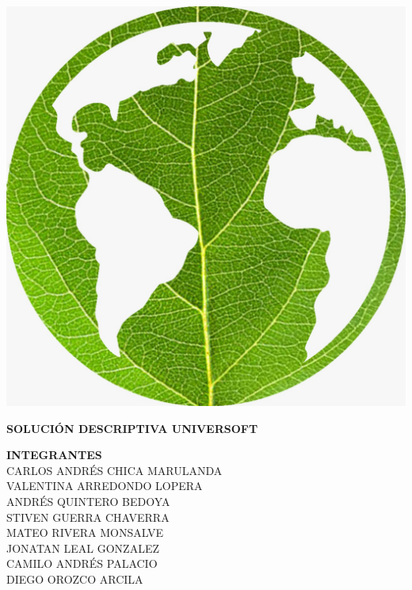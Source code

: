 \documentclass[12pt]{article}
\begin{document}
\begin{center}
\includegraphics[scale=0.09]{d9be6c98-ebe9-4689-a05a-98793fd7144a.jpg} 
\end{center}

\begin{center}
\vspace*{0.9cm}
\textbf{\Large{SOLUCIÓN DESCRIPTIVA UNIVERSOFT}}
\vspace*{0.9cm}
\end{center}

\begin{center}
\textbf{\large INTEGRANTES}
\\
\vspace*{0.2cm}
\normalsize {CARLOS ANDRÉS CHICA MARULANDA\\
VALENTINA ARREDONDO LOPERA\\
ANDRÉS  QUINTERO BEDOYA\\
STIVEN GUERRA CHAVERRA\\
MATEO RIVERA MONSALVE\\
JONATAN LEAL GONZALEZ\\
CAMILO ANDRÉS  PALACIO\\
DIEGO OROZCO ARCILA\\}
\end{center}
\vspace*{0.6cm}
\end{document}

